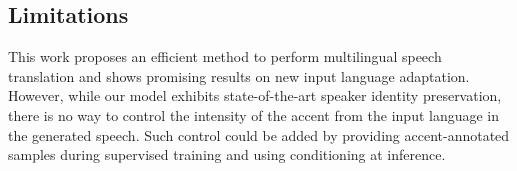\subsection{Limitations}
\label{sec:limitations}

This work proposes an efficient method to perform multilingual speech translation and shows promising results on new input language adaptation.
However, while our model exhibits state-of-the-art speaker identity preservation, there is no way to control the intensity of the accent from the input language in the generated speech. Such control could be added by providing accent-annotated samples during supervised training and using conditioning at inference.